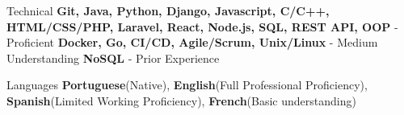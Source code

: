 
\begin{cvskills}
  \cvskill
    {Technical} %
    {\textbf{Git, Java, Python, Django, Javascript, C/C++, HTML/CSS/PHP, Laravel, React, Node.js, SQL, REST API, OOP} - Proficient \break \textbf{Docker, Go, CI/CD, Agile/Scrum, Unix/Linux} - Medium Understanding \break \textbf{NoSQL} - Prior Experience} %

  \cvskill
    {Languages} %
    {\textbf{Portuguese}(Native), \textbf{English}(Full Professional Proficiency), \textbf{Spanish}(Limited Working Proficiency), \textbf{French}(Basic understanding) } %

\end{cvskills}